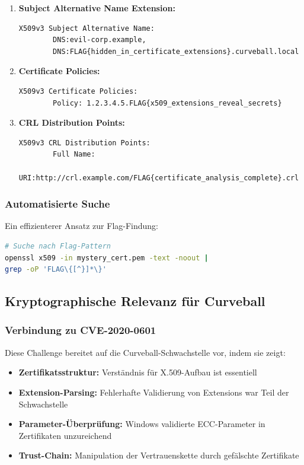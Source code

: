 \documentclass{article}
\begin{document}
\begin{enumerate}[leftmargin=1.5cm]
    \item \textbf{Subject Alternative Name Extension:} 
    \begin{lstlisting}[caption=SAN Extension mit Flag]
    X509v3 Subject Alternative Name:
        DNS:evil-corp.example, 
        DNS:FLAG{hidden_in_certificate_extensions}.curveball.local
    \end{lstlisting}
    
    \item \textbf{Certificate Policies:}
    \begin{lstlisting}[caption=Certificate Policies mit Flag]
    X509v3 Certificate Policies:
        Policy: 1.2.3.4.5.FLAG{x509_extensions_reveal_secrets}
    \end{lstlisting}
    
    \item \textbf{CRL Distribution Points:}
    \begin{lstlisting}[caption=CRL Distribution Points mit Flag]
    X509v3 CRL Distribution Points:
        Full Name:
          URI:http://crl.example.com/FLAG{certificate_analysis_complete}.crl
    \end{lstlisting}
\end{enumerate}

\subsubsection{Automatisierte Suche}
Ein effizienterer Ansatz zur Flag-Findung:

\begin{lstlisting}[language=bash,caption={Automatisierte Flag-Suche}]
# Suche nach Flag-Pattern
openssl x509 -in mystery_cert.pem -text -noout | 
grep -oP 'FLAG\{[^}]*\}'
\end{lstlisting}

\subsection{Kryptographische Relevanz für Curveball}

\subsubsection{Verbindung zu CVE-2020-0601}
Diese Challenge bereitet auf die Curveball-Schwachstelle vor, indem sie zeigt:

\begin{itemize}
    \item \textbf{Zertifikatsstruktur:} Verständnis für X.509-Aufbau ist essentiell
    \item \textbf{Extension-Parsing:} Fehlerhafte Validierung von Extensions war Teil der Schwachstelle
    \item \textbf{Parameter-Überprüfung:} Windows validierte ECC-Parameter in Zertifikaten unzureichend
    \item \textbf{Trust-Chain:} Manipulation der Vertrauenskette durch gefälschte Zertifikate
\end{itemize}
\end{document}

